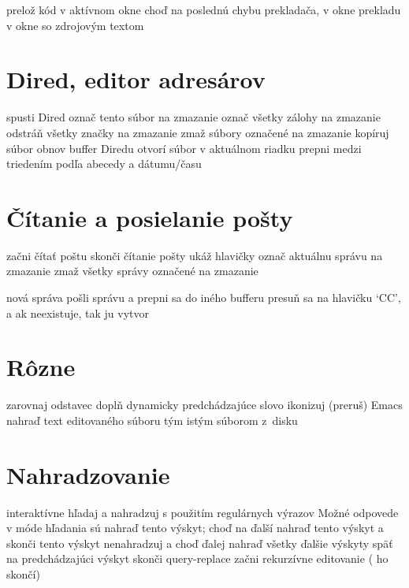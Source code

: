  prelož kód v aktívnom okne
 choď na poslednú chybu prekladača, v okne prekladu
 v okne so zdrojovým textom

\section{Dired, editor adresárov}

 spusti Dired
 označ tento súbor na zmazanie
\key{\~{}} označ všetky zálohy na zmazanie
 odstráň všetky značky na zmazanie
 zmaž súbory označené na zmazanie
 kopíruj súbor
 obnov buffer Diredu
 otvorí súbor v aktuálnom riadku
 prepni medzi triedením podľa abecedy a dátumu/času

\section{Čítanie a posielanie pošty}

 začni čítať poštu
 skonči čítanie pošty
 ukáž hlavičky
 označ aktuálnu správu na zmazanie
 zmaž všetky správy označené na zmazanie

 nová správa
 pošli správu a prepni sa do iného bufferu
 presuň sa na hlavičku `CC', a ak neexistuje, tak ju
vytvor

\section{Rôzne}

 zarovnaj odstavec
 doplň dynamicky predchádzajúce slovo
 ikonizuj (preruš) Emacs
 nahraď text editovaného súboru tým istým súborom z~disku

\section{Nahradzovanie}

 interaktívne hľadaj a nahradzuj
 s použitím regulárnych výrazov
\askip
Možné odpovede v móde hľadania sú
\askip
{} nahraď tento výskyt; choď na ďalší
\key{,} nahraď tento výskyt a skonči
 tento výskyt nenahradzuj a choď ďalej
\key{!} nahraď všetky ďalšie výskyty
\key{\^{}} späť na predchádzajúci výskyt
 skonči query-replace
 začni rekurzívne editovanie ( ho skončí)

